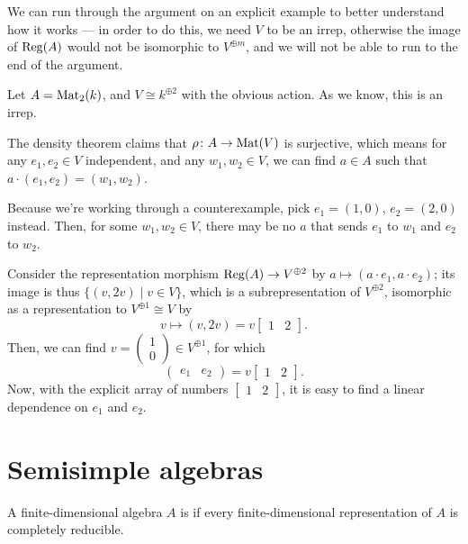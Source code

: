 \begin{example}
	We can run through the argument on an explicit example to better understand
	how it works --- in order to do this, we need $V$ to be an irrep,
	otherwise the image of $\operatorname{Reg}(A)$ would not be isomorphic to $V^{\oplus m}$,
	and we will not be able to run to the end of the argument.

	Let $A=\mathrm{Mat}_2(k)$, and $V \cong k^{\oplus 2}$ with the obvious action.
	As we know, this is an irrep.

	The density theorem claims that $\rho \colon A \to \mathrm{Mat}(V)$ is surjective, which
	means for any $e_1, e_2 \in V$ independent, and any $w_1, w_2 \in V$, we can
	find $a \in A$ such that $a \cdot (e_1, e_2) = (w_1, w_2)$.

	Because we're working through a counterexample, pick $e_1=(1, 0)$, $e_2=(2, 0)$ instead.
	Then, for some $w_1, w_2 \in V$,
	there may be no $a$ that sends $e_1$ to $w_1$ and $e_2$ to $w_2$.

	Consider the representation morphism $\operatorname{Reg}(A) \to V^{\oplus 2}$ by
	$a \mapsto(a \cdot e_1, a \cdot e_2)$;
	its image is thus $\{(v, 2v) \mid v \in V \}$,
	which is a subrepresentation of $V^{\oplus 2}$,
	isomorphic as a representation to $V^{\oplus 1}\cong V$ by
	\[ v \mapsto(v, 2v) = v \begin{bmatrix} 1 & 2 \end{bmatrix}. \]
	Then, we can find $v=\begin{pmatrix}1 \\ 0\end{pmatrix}\in V^{\oplus 1}$,
	for which
	\[ \begin{pmatrix} e_1 & e_2 \end{pmatrix} = v \begin{bmatrix} 1 & 2 \end{bmatrix}. \]
	Now, with the explicit array of numbers $\begin{bmatrix} 1 & 2 \end{bmatrix}$,
	it is easy to find a linear dependence on $e_1$ and $e_2$.
\end{example}

\section{Semisimple algebras}
\begin{definition}
	A finite-dimensional algebra $A$ is 
	if every finite-dimensional representation of $A$ is completely reducible.
\end{definition}

